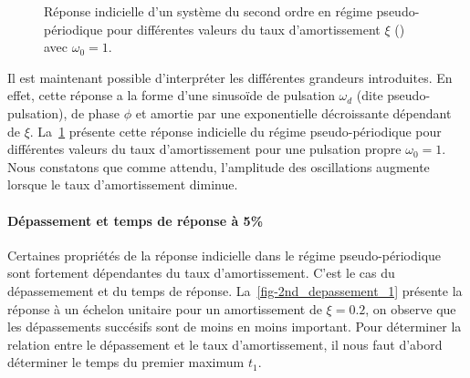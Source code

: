 \begin{figure}[!t]
\begin{center}
\caption{Réponse indicielle d'un système du second ordre en régime pseudo-périodique pour 
différentes valeurs du taux d'amortissement $\xi$  () avec $\omega_0=1$. \label{fig-2nd_pp}}
\end{center}
\end{figure}

Il est maintenant possible d'interpréter les différentes grandeurs introduites. En effet,
cette réponse a la forme d'une sinuso\"ide de pulsation $\omega_d$
(dite pseudo-pulsation), de phase $\phi$ et amortie par une exponentielle décroissante dépendant de $\xi$.
La~\cref{fig-2nd_pp} présente cette réponse indicielle du régime pseudo-périodique pour différentes valeurs du 
taux d'amortissement pour une pulsation propre $\omega_0=1$.
Nous constatons que comme attendu, l'amplitude des oscillations augmente lorsque le taux d'amortissement diminue.

\newpage
\paragraph{Dépassement et temps de réponse à 5\%}
Certaines propriétés de la réponse indicielle dans le régime pseudo-périodique sont fortement 
dépendantes du taux d'amortissement. C'est le cas du dépassemement et du temps de réponse. 
La~\cref{fig-2nd_depassement_1} présente la réponse à un échelon unitaire pour un amortissement de $\xi=0.2$, 
on observe que les dépassements succésifs sont de moins en moins important. Pour déterminer la relation entre
le dépassement et le taux d'amortissement, il nous faut d'abord déterminer le temps du premier maximum $t_1$.

